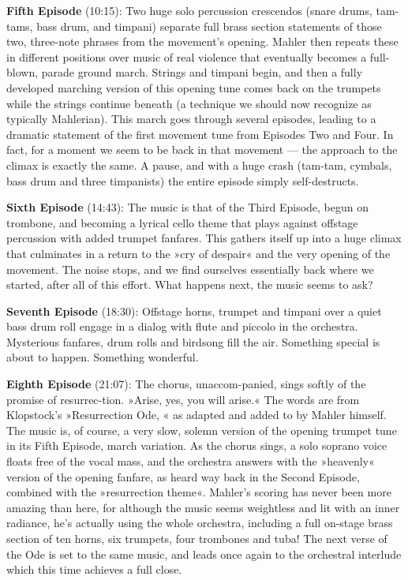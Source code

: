 \documentclass[12pt]{article}%
\begin{document}
{\bf Fifth Episode} (10:15): Two huge solo percussion crescendos (snare drums, tam-tams, bass drum, and timpani) separate full brass section statements of those two, three-note phrases from the movement's opening. Mahler then repeats these in different positions over music of real violence that eventually becomes a full-blown, parade ground march. Strings and timpani begin, and then a fully developed marching version of this opening tune comes back on the trumpets while the strings continue beneath (a technique we should now recognize as typically Mahlerian). This march goes through several episodes, leading to a dramatic statement of the first movement tune from Episodes Two and Four. In fact, for a moment we seem to be back in that movement --- the approach to the climax is exactly the same. A pause, and with a huge crash (tam-tam, cymbals, bass drum and three timpanists) the entire episode simply self-destructs.

{\bf Sixth Episode} (14:43): The music is that of the Third Episode, begun on trombone, and becoming a lyrical cello theme that plays against offstage percussion with added trumpet fanfares.
This gathers itself up into a huge climax that culminates in a return to the »cry of despair« and the very opening of the movement. The noise stops, and we find ourselves essentially back where we started, after all of this effort. What happens next, the music seems to ask?

{\bf Seventh Episode} (18:30): Offstage horns, trumpet and timpani over a quiet bass drum roll engage in a dialog with flute and piccolo in the orchestra. Mysterious fanfares, drum rolls and birdsong fill the air. Something special is about to happen. Something wonderful.

{\bf Eighth Episode} (21:07): The chorus, unaccom-panied, sings softly of the promise of resurrec-tion. »Arise, yes, you will arise.« The words are from Klopstock's »Resurrection Ode, « as adapted and added to by Mahler himself. The music is, of course, a very slow, solemn version of the opening trumpet tune in its Fifth Episode, march variation. As the chorus sings, a solo soprano voice floats free of the vocal mass, and the orchestra answers with the »heavenly« version of the opening fanfare, as heard way back in the Second Episode, combined with the »resurrection theme«. Mahler's scoring has never been more amazing than here, for although the music seems weightless and lit with an inner radiance, he's actually using the whole orchestra, including a full on-stage brass section of ten horns, six trumpets, four trombones and tuba!
The next verse of the Ode is set to the same music, and leads once again to the orchestral interlude which this time achieves a full close.
\end{document}
